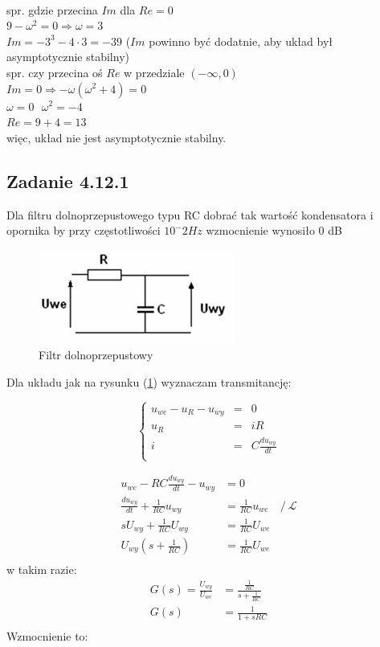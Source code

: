\noindent\\
spr. gdzie przecina $Im$ dla $Re=0$\\
$9-\omega^2=0\Rightarrow\omega=3$\\
$Im=-3^3-4\cdot 3=-39$ {\color{lightgray} ($Im$ powinno być dodatnie, aby układ był asymptotycznie stabilny)}\\
spr. czy przecina oś $Re$ w przedziale $(-\infty, 0)$\\
$Im=0\Rightarrow -\omega(\omega^2+4)=0$\\
$\omega=0 \ \ \ \omega^2=-4$\\
$Re=9+4=13$\\
więc, układ nie jest asymptotycznie stabilny.

\subsection*{Zadanie 4.12.1}
Dla filtru dolnoprzepustowego typu RC dobrać tak wartość kondensatora i opornika by przy częstotliwości $10^-2 Hz$ wzmocnienie wynosiło 0 dB

\begin{figure}[h!]
\centering
\includegraphics[width=0.4\linewidth]{RCdiagram4_12_1}
\caption{Filtr dolnoprzepustowy}
\label{fig:RCdiagram4}
\end{figure}
Dla układu jak na rysunku (\ref{fig:RCdiagram4}) wyznaczam transmitancję:

\begin{equation}
\left\lbrace \begin{array}{rcl}
u_{we} - u_R - u_{wy} &=& 0 \\
u_{R} &=& i  R \\
i &=& C  \frac{d u_{wy}}{dt} \\
\end{array}\right.
\end{equation}
 




\begin{align} 
u_{we} - RC \frac{d u_{wy}}{dt} - u_{wy} &= 0 \\
 \frac{d u_{wy}}{dt} + \frac{1}{RC}  u_{wy} &= \frac{1}{RC} u_{we}    \quad /\ \mathcal{L} \\
 s U_{wy} + \frac{1}{RC}  U_{wy} &= \frac{1}{RC} U_{we} \\
 U_{wy}  \left(  s+ \frac{1}{RC}\right) &=  \frac{1}{RC} U_{we} \\
\end{align}
w takim razie:
\begin{align} 
G(s)  = \frac{U_{wy}}{U_{we}} &= \frac{\frac{1}{RC}}{s+ \frac{1}{RC} }\\
 G(s) &= \frac{1}{1 + sRC} \\
\end{align}
Wzmocnienie to:




